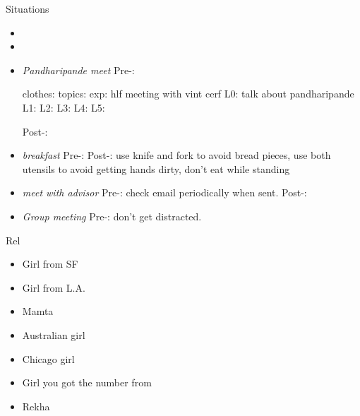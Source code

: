\begin{frame}
\begin{columns}
\begin{column}{0.20\linewidth}
\begin{block}{Situations}
        \begin{itemize} 

        \item \tiny \item 
          \tiny \item \tiny {} \textit{Pandharipande
            meet} Pre-: 

          clothes: 
          topics: exp: hlf meeting with vint cerf L0: talk about pandharipande  L1:    L2:     L3:  L4:   L5: 

           Post-: 
          
           \tiny \item \tiny \textit{breakfast} Pre-: Post-: use knife and
           fork to avoid bread pieces, use both utensils to avoid
           getting hands dirty, don't eat while standing 
          \tiny \item \tiny \textit{meet with advisor} Pre-: check
          email periodically when sent. Post-: 
        \item \tiny \textit{Group meeting} Pre-: don't get
          distracted. 
        \end{itemize} 

      \end{block}






\begin{block}{Rel}
  \begin{itemize} 
    \small \item \small Girl from SF 
    \small \item \small Girl from L.A. 
    \small \item \small Mamta 


    \item \small Australian girl
    \small \item \small Chicago girl 
    \small \item \small Girl you got the number from 
    \small \item \small Rekha


\end{itemize}
\end{block}
\end{column}
\end{columns}
\end{frame}
